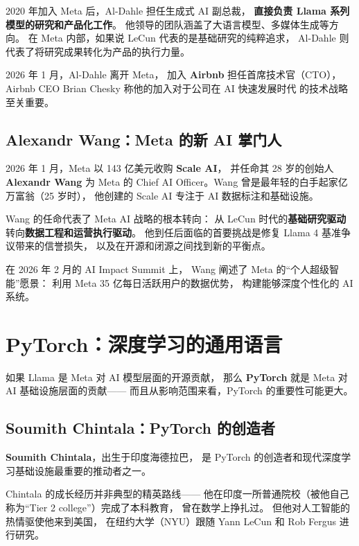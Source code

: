 2020 年加入 Meta 后，Al-Dahle 担任生成式 AI 副总裁，
\textbf{直接负责 Llama 系列模型的研究和产品化工作}。
他领导的团队涵盖了大语言模型、多媒体生成等方向。
在 Meta 内部，如果说 LeCun 代表的是基础研究的纯粹追求，
Al-Dahle 则代表了将研究成果转化为产品的执行力量。

2026 年 1 月，Al-Dahle 离开 Meta，
加入 \textbf{Airbnb} 担任首席技术官（CTO），
Airbnb CEO Brian Chesky 称他的加入对于公司在 AI 快速发展时代
的技术战略至关重要。

\subsection{Alexandr Wang：Meta 的新 AI 掌门人}

2026 年 1 月，Meta 以 143 亿美元收购 \textbf{Scale AI}，
并任命其 28 岁的创始人 \textbf{Alexandr Wang} 为 Meta 的
Chief AI Officer。Wang 曾是最年轻的白手起家亿万富翁（25 岁时），
他创建的 Scale AI 专注于 AI 数据标注和基础设施。

Wang 的任命代表了 Meta AI 战略的根本转向：
从 LeCun 时代的\textbf{基础研究驱动}
转向\textbf{数据工程和运营执行驱动}。
他到任后面临的首要挑战是修复 Llama 4 基准争议带来的信誉损失，
以及在开源和闭源之间找到新的平衡点。

在 2026 年 2 月的 AI Impact Summit 上，
Wang 阐述了 Meta 的``个人超级智能''愿景：
利用 Meta 35 亿每日活跃用户的数据优势，
构建能够深度个性化的 AI 系统。


\section{PyTorch：深度学习的通用语言}
\label{sec:pytorch}

如果 Llama 是 Meta 对 AI 模型层面的开源贡献，
那么 \textbf{PyTorch} 就是 Meta 对 AI 基础设施层面的贡献——
而且从影响范围来看，PyTorch 的重要性可能更大。

\subsection{Soumith Chintala：PyTorch 的创造者}

\textbf{Soumith Chintala}，出生于印度海德拉巴，
是 PyTorch 的创造者和现代深度学习基础设施最重要的推动者之一。

Chintala 的成长经历并非典型的精英路线——
他在印度一所普通院校（被他自己称为``Tier 2 college''）完成了本科教育，
曾在数学上挣扎过。
但他对人工智能的热情驱使他来到美国，
在纽约大学（NYU）跟随 Yann LeCun 和 Rob Fergus 进行研究。

